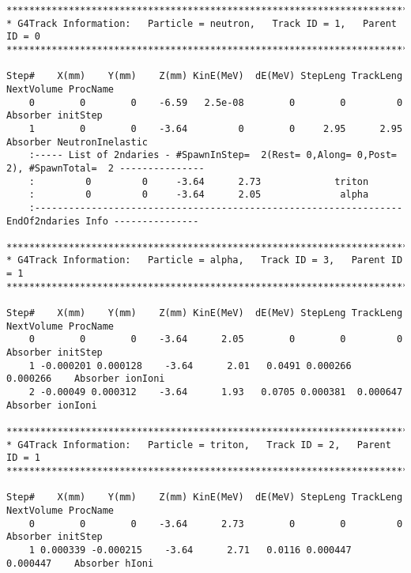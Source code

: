 \begin{lstlisting}
*********************************************************************************************************
* G4Track Information:   Particle = neutron,   Track ID = 1,   Parent ID = 0
*********************************************************************************************************

Step#    X(mm)    Y(mm)    Z(mm) KinE(MeV)  dE(MeV) StepLeng TrackLeng  NextVolume ProcName
    0        0        0    -6.59   2.5e-08        0        0         0    Absorber initStep
    1        0        0    -3.64         0        0     2.95      2.95    Absorber NeutronInelastic
    :----- List of 2ndaries - #SpawnInStep=  2(Rest= 0,Along= 0,Post= 2), #SpawnTotal=  2 ---------------
    :         0         0     -3.64      2.73             triton
    :         0         0     -3.64      2.05              alpha
    :----------------------------------------------------------------- EndOf2ndaries Info ---------------

*********************************************************************************************************
* G4Track Information:   Particle = alpha,   Track ID = 3,   Parent ID = 1
*********************************************************************************************************

Step#    X(mm)    Y(mm)    Z(mm) KinE(MeV)  dE(MeV) StepLeng TrackLeng  NextVolume ProcName
    0        0        0    -3.64      2.05        0        0         0    Absorber initStep
    1 -0.000201 0.000128    -3.64      2.01   0.0491 0.000266  0.000266    Absorber ionIoni
    2 -0.00049 0.000312    -3.64      1.93   0.0705 0.000381  0.000647    Absorber ionIoni

*********************************************************************************************************
* G4Track Information:   Particle = triton,   Track ID = 2,   Parent ID = 1
*********************************************************************************************************

Step#    X(mm)    Y(mm)    Z(mm) KinE(MeV)  dE(MeV) StepLeng TrackLeng  NextVolume ProcName
    0        0        0    -3.64      2.73        0        0         0    Absorber initStep
    1 0.000339 -0.000215    -3.64      2.71   0.0116 0.000447  0.000447    Absorber hIoni
\end{lstlisting}

